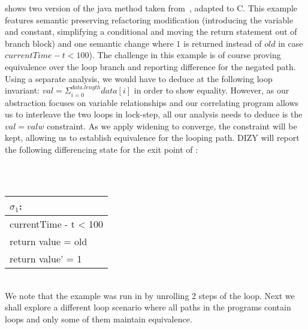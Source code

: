  shows two version of the java  method taken from~\cite{DwyerElbaumPerson08}, adapted to C. This example features semantic preserving refactoring modification (introducing the  variable and  constant, simplifying a conditional and moving the return statement out of branch block) and one semantic change where $1$ is returned instead of $old$ in case $currentTime - t < 100$). The challenge in this example is of course proving equivalence over the loop branch and reporting difference for the negated path. Using a separate analysis, we would have to deduce at the following loop invariant: $val = \Sigma_{i=0}^{data.length}data[i]$ in order to show equality. However, as our abstraction focuses on variable relationships and our correlating program allows us to interleave the two loops in lock-step, all our analysis needs to deduce is the $val = valw$ constraint. As we apply widening to converge, the constraint will be kept, allowing us to establish equivalence for the looping path. DIZY will report the following differencing state for the exit point of :
\begin{tabular}{c}
\\
\end{tabular}
\\
\begin{tabular}{l}
$\sigma_1$:
\\ \hline
currentTime - t < 100
\\
return value = old
\\
return value' = 1
\\ \hline
\end{tabular}
\\
We note that the example was run in \cite{DwyerElbaumPerson08} by unrolling 2 steps of the loop. Next we shall explore a different loop scenario where all paths in the programs contain loops and only some of them maintain equivalence.




